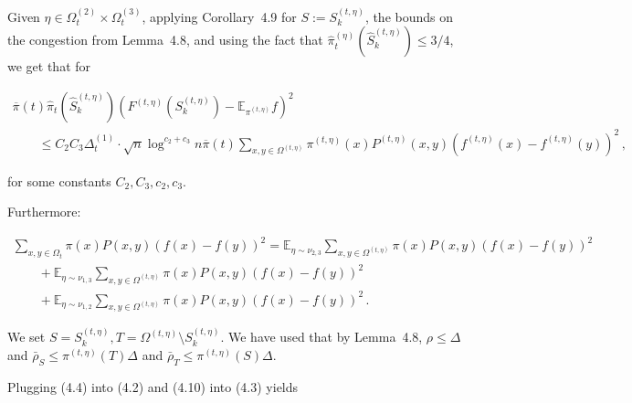 \documentclass[10pt,a4paper]{article}
\begin{document}
Given $\eta\in\Omega_{t}^{(2)}\times\Omega_{t}^{(3)}$, applying Corollary 4.9 for $S:=S_{k}^{(t,\eta)}$, the bounds on the congestion from Lemma 4.8, and using the fact that $\hat{\pi}_{t}^{(\eta)}(\hat{S}_{k}^{(t,\eta)})\leq 3/4$, we get that for\par


\[\begin{gathered}
\displaystyle\overline{\pi}(t)\hat{\pi}_{t}\left(\hat{S}_{k}^{(t,\eta)}\right)\left(F^{(t,\eta)}(S_{k}^{(t,\eta)})-\mathbb{E}_{\pi^{(t,\eta)}}f\right)^{2} \\
\displaystyle\qquad\leq C_{2}C_{3}\Delta_{t}^{(1)}\cdot\sqrt{n}\log^{c_{2}+c_{3}}n\overline{\pi}(t)\sum_{x,y\in\Omega^{(t,\eta)}}\pi^{(t,\eta)}(x)P^{(t,\eta)}(x,y)(f^{(t,\eta)}(x)-f^{(t,\eta)}(y))^{2}\,,
\end{gathered}\]


for some constants $C_{2},C_{3},c_{2},c_{3}$.\par




Furthermore:\par


\[\begin{gathered}
\displaystyle\sum_{x,y\in\Omega_{t}}\pi(x)P(x,y)(f(x)-f(y))^{2} \displaystyle=\mathbb{E}_{\eta\sim\nu_{2,3}}\sum_{x,y\in\Omega^{(t,\eta)}}\pi(x)P(x,y)(f(x)-f(y))^{2} \\
\displaystyle\qquad+\mathbb{E}_{\eta\sim\nu_{1,3}}\sum_{x,y\in\Omega^{(t,\eta)}}\pi(x)P(x,y)(f(x)-f(y))^{2} \\
\displaystyle\qquad+\mathbb{E}_{\eta\sim\nu_{1,2}}\sum_{x,y\in\Omega^{(t,\eta)}}\pi(x)P(x,y)(f(x)-f(y))^{2}\,.
\end{gathered}\]




We set $S=S_{k}^{(t,\eta)},T=\Omega^{(t,\eta)}\setminus S_{k}^{(t,\eta)}$. We have used that by Lemma 4.8, $\rho\leq\Delta$ and $\bar{\rho}_{S}\leq\pi^{(t,\eta)}(T)\Delta$ and $\bar{\rho}_{T}\leq\pi^{(t,\eta)}(S)\Delta$.\par




Plugging (4.4) into (4.2) and (4.10) into (4.3) yields\par
\end{document}
